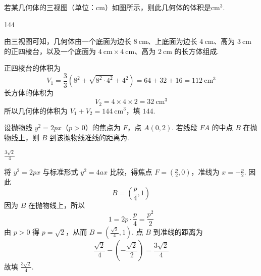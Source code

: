 \begin{problem}
若某几何体的三视图（单位：\(\mathrm{cm}\)）如图所示，则此几何体的体积是\fillinblank{}\(\mathrm{cm}^3\).

\begin{answer}
144
\end{answer}

\begin{solution}
由三视图可知，几何体由一个底面为边长 \(8\mathrm{~cm}\)、上底面为边长 \(4\mathrm{~cm}\)、高为 \(3\mathrm{~cm}\) 的正四棱台，以及一个底面为 \(4\mathrm{~cm}\times4\mathrm{~cm}\)、高为 \(2\mathrm{~cm}\) 的长方体组成.

正四棱台的体积为
\[
V_1=\frac{3}{3}\left(8^2+\sqrt{8^2\cdot4^2}+4^2\right)=64+32+16=112\mathrm{~cm}^3
\]
长方体的体积为
\[
V_2=4\times4\times2=32\mathrm{~cm}^3
\]
所以几何体的体积为 \(V_1+V_2=144\mathrm{~cm}^3\)，填 \(144\).
\end{solution}
\end{problem}

\begin{problem}
设抛物线 \(y^{2}=2px\)（\(p>0\)）的焦点为 \(F\)，点 \(A(0,2)\). 若线段 \(FA\) 的中点 \(B\) 在抛物线上，则 \(B\) 到该抛物线准线的距离为\fillinblank{}.
\begin{answer}
\(\frac{3\sqrt{2}}{4}\)
\end{answer}

\begin{solution}
将 \(y^2=2px\) 与标准形式 \(y^2=4ax\) 比较，得焦点 \(F=(\frac p2,0)\)，准线为 \(x=-\frac p2\). 因此
\[
B=\left(\frac p4,1\right)
\]
因为 \(B\) 在抛物线上，所以
\[
1=2p\cdot\frac p4=\frac{p^2}{2}
\]
由 \(p>0\) 得 \(p=\sqrt2\)，从而 \(B=(\frac{\sqrt2}{4},1)\). 点 \(B\) 到准线的距离为
\[
\frac{\sqrt2}{4}-\left(-\frac{\sqrt2}{2}\right)=\frac{3\sqrt2}{4}
\]
故填 \(\frac{3\sqrt2}{4}\).
\end{solution}
\end{problem}

